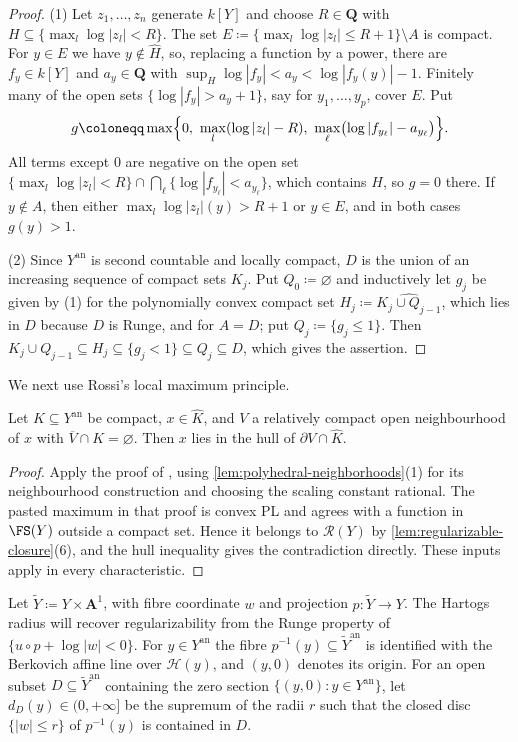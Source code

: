 \documentclass[11pt,a4paper]{article}
\newcommand{\an}{\mathrm{an}}          %
\begin{document}
\begin{proof}
(1) Let $z_1,\ldots,z_n$ generate $k[Y]$ and choose $R\in\mathbf Q$ with $H\subseteq\{\max_l\log|z_l|<R\}$. The set $E\coloneqq\{\max_l\log|z_l|\le R+1\}\setminus A$ is compact. For $y\in E$ we have $y\notin\widehat H$, so, replacing a function by a power, there are $f_y\in k[Y]$ and $a_y\in\mathbf Q$ with $\sup_H\log|f_y|<a_y<\log|f_y(y)|-1$. Finitely many of the open sets $\{\log|f_y|>a_y+1\}$, say for $y_1,\ldots,y_p$, cover $E$. Put
\[
g\coloneqq\max\Bigl\{0,\ \max_l(\log|z_l|-R),\ \max_{\ell}\bigl(\log|f_{y_\ell}|-a_{y_\ell}\bigr)\Bigr\}.
\]
All terms except $0$ are negative on the open set $\{\max_l\log|z_l|<R\}\cap\bigcap_\ell\{\log|f_{y_\ell}|<a_{y_\ell}\}$, which contains $H$, so $g=0$ there. If $y\notin A$, then either $\max_l\log|z_l|(y)>R+1$ or $y\in E$, and in both cases $g(y)>1$.

(2) Since $Y^{\an}$ is second countable and locally compact, $D$ is the union of an increasing sequence of compact sets $K_j$. Put $Q_0\coloneqq\varnothing$ and inductively let $g_j$ be given by (1) for the polynomially convex compact set $H_j\coloneqq\widehat{K_j\cup Q_{j-1}}$, which lies in $D$ because $D$ is Runge, and for $A=D$; put $Q_j\coloneqq\{g_j\le1\}$. Then $K_j\cup Q_{j-1}\subseteq H_j\subseteq\{g_j<1\}\subseteq Q_j\subseteq D$, which gives the assertion.
\end{proof}

We next use Rossi's local maximum principle.

\begin{lemma}\label{lem:rossi}
Let $K\subseteq Y^{\an}$ be compact, $x\in\widehat K$, and $V$ a relatively compact open neighbourhood of $x$ with $\overline V\cap K=\varnothing$. Then $x$ lies in the hull of $\partial V\cap\widehat K$.
\end{lemma}

\begin{proof}
Apply the proof of \cite[Theorem~5.6]{Wu26}, using \cref{lem:polyhedral-neighborhoods}(1) for its neighbourhood construction and choosing the scaling constant rational. The pasted maximum in that proof is convex PL and agrees with a function in $\FS(Y)$ outside a compact set. Hence it belongs to $\mathcal{R}(Y)$ by \cref{lem:regularizable-closure}(6), and the hull inequality gives the contradiction directly. These inputs apply in every characteristic.
\end{proof}

Let $\widetilde Y\coloneqq Y\times\mathbf A^1$, with fibre coordinate $w$ and projection $p\colon\widetilde Y\to Y$. The Hartogs radius will recover regularizability from the Runge property of $\{u\circ p+\log|w|<0\}$. For $y\in Y^{\an}$ the fibre $p^{-1}(y)\subseteq\widetilde Y^{\an}$ is identified with the Berkovich affine line over $\mathcal H(y)$, and $(y,0)$ denotes its origin. For an open subset $D\subseteq\widetilde Y^{\an}$ containing the zero section $\{(y,0):y\in Y^{\an}\}$, let $d_D(y)\in(0,+\infty]$ be the supremum of the radii $r$ such that the closed disc $\{|w|\le r\}$ of $p^{-1}(y)$ is contained in $D$.
\end{document}
